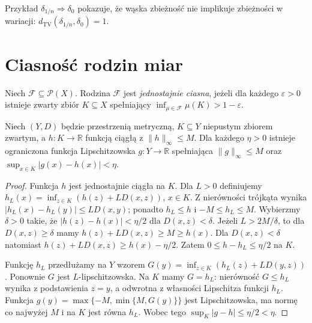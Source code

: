 \begin{uwaga}
Przykład $\delta_{1/n}\Rightarrow\delta_0$ pokazuje,
że wąska zbieżność nie implikuje zbieżności w wariacji:
$d_{\mathrm{TV}}(\delta_{1/n},\delta_0)=1$.
\end{uwaga}

\section{Ciasność rodzin miar}
\begin{definicja}
\label{def:uniform-tight-22}
Niech $\mathcal F\subseteq\mathcal P(X)$.
Rodzina $\mathcal F$ jest \emph{jednostajnie ciasna},
jeżeli dla każdego $\varepsilon>0$ istnieje
zwarty zbiór $K\subseteq X$ spełniający
$\inf_{\mu\in\mathcal F}\mu(K)>1-\varepsilon$.
\end{definicja}

\begin{lemat}
\label{lem:lipschitz-extend-22}
Niech $(Y,D)$ będzie przestrzenią metryczną, $K\subseteq Y$
niepustym zbiorem zwartym, a $h:K\to\mathbb R$ funkcją
ciągłą z $\|h\|_\infty\le M$. Dla każdego $\eta>0$
istnieje ograniczona funkcja Lipschitzowska
$g:Y\to\mathbb R$ spełniająca
$\|g\|_\infty\le M$ oraz
$\sup_{x\in K}|g(x)-h(x)|<\eta$.
\end{lemat}
\begin{proof}
Funkcja $h$ jest jednostajnie ciągła na $K$.
Dla $L>0$ definiujemy
$h_L(x)=\inf_{z\in K}(h(z)+L D(x,z))$, $x\in K$.
Z nierówności trójkąta wynika
$|h_L(x)-h_L(y)|\le L D(x,y)$; ponadto
$h_L\le h$ i $-M\le h_L\le M$.
Wybierzmy $\delta>0$ takie, że
$|h(z)-h(x)|<\eta/2$ dla $D(x,z)<\delta$.
Jeżeli $L>2M/\delta$, to dla $D(x,z)\ge\delta$
mamy $h(z)+LD(x,z)\ge M\ge h(x)$.
Dla $D(x,z)<\delta$ natomiast
$h(z)+LD(x,z)\ge h(x)-\eta/2$.
Zatem $0\le h-h_L\le\eta/2$ na $K$.

Funkcję $h_L$ przedłużamy na $Y$ wzorem
$G(y)=\inf_{z\in K}(h_L(z)+L D(y,z))$.
Ponownie $G$ jest $L$-lipschitzowska. Na $K$
mamy $G=h_L$: nierówność $G\le h_L$ wynika
z podstawienia $z=y$, a odwrotna z własności
Lipschitza funkcji $h_L$. Funkcja
$g(y)=\max\{-M,\min\{M,G(y)\}\}$ jest Lipschitzowska,
ma normę co najwyżej $M$ i na $K$ jest równa $h_L$.
Wobec tego $\sup_K|g-h|\le\eta/2<\eta$.
\end{proof}

